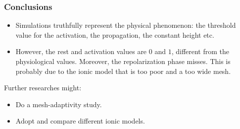 \documentclass[9pt]{beamer}
\begin{document}
\begin{frame}
\frametitle{Conclusions}
\begin{itemize}
	\item Simulations truthfully represent the physical phenomenon: the threshold value for the activation, the propagation, the constant height etc.
	\item However, the rest and activation values are $0$ and $1$, different from the physiological values. Moreover, the repolarization phase misses.
This is probably due to the ionic model that is too poor and a too wide mesh. 
\end{itemize}
\vspace{4mm}
Further researches might:
\begin{itemize}
	\item Do a mesh-adaptivity study.
	\item Adopt and compare different ionic models.
\end{itemize}
\end{frame}
\end{document}
